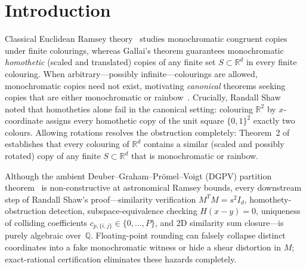 \documentclass[11pt,twocolumn]{article}
\newcommand{\QQ}{\mathbb{Q}}
\begin{document}
\section{Introduction}
Classical Euclidean Ramsey theory~\cite{erdos1973euclidean} studies monochromatic congruent copies under finite colourings, whereas Gallai's theorem guarantees monochromatic \emph{homothetic} (scaled and translated) copies of any finite set $S \subset \mathbb{R}^d$ in every finite colouring. When arbitrary—possibly infinite—colourings are allowed, monochromatic copies need not exist, motivating \emph{canonical} theorems seeking copies that are either monochromatic or rainbow~\cite{cheng2024euclidean}. Crucially, Randall Shaw~\cite{randallshaw2026gallai} noted that homotheties alone fail in the canonical setting: colouring $\mathbb{R}^2$ by $x$-coordinate assigns every homothetic copy of the unit square $\{0,1\}^2$ exactly two colours. Allowing rotations resolves the obstruction completely: Theorem~2 of~\cite{randallshaw2026gallai} establishes that every colouring of $\mathbb{R}^d$ contains a similar (scaled and possibly rotated) copy of any finite $S \subset \mathbb{R}^d$ that is monochromatic or rainbow.

Although the ambient Deuber--Graham--Pr\"omel--Voigt (DGPV) partition theorem~\cite{deuber1983canonical,promel1986elementary} is non-constructive at astronomical Ramsey bounds, every downstream step of Randall Shaw's proof—similarity verification $M^T M = s^2 I_d$, homothety-obstruction detection, subspace-equivalence checking $H(x - y) = 0$, uniqueness of colliding coefficients $c_{p,\{i,j\}} \in \{0,\dots,P\}$, and 2D similarity sum closure—is purely algebraic over~$\QQ$. Floating-point rounding can falsely collapse distinct coordinates into a fake monochromatic witness or hide a shear distortion in $M$; exact-rational certification eliminates these hazards completely.
\end{document}
